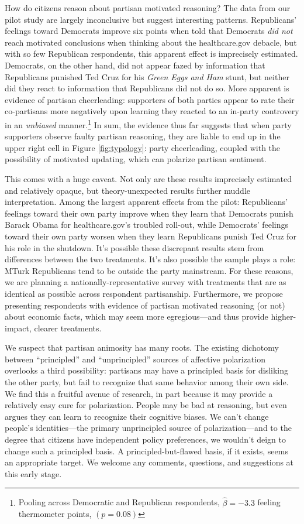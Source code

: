 \documentclass[12pt, letterpaper]{article}
\begin{document}
How do citizens reason about partisan motivated reasoning? The data from our pilot study are largely inconclusive but suggest interesting patterns. Republicans' feelings toward Democrats improve six points when told that Democrats \emph{did not} reach motivated conclusions when thinking about the healthcare.gov debacle, but with so few Republican respondents, this apparent effect is imprecisely estimated. Democrats, on the other hand, did not appear fazed by information that Republicans punished Ted Cruz for his \emph{Green Eggs and Ham} stunt, but neither did they react to information that Republicans did not do so. More apparent is evidence of partisan cheerleading: supporters of both parties appear to rate their co-partisans more negatively upon learning they reacted to an in-party controvery in an \emph{unbiased} manner.\footnote{Pooling across Democratic and Republican respondents, $\hat{\beta}=-3.3$ feeling thermometer points, $(p=0.08)$} In sum, the evidence thus far suggests that when party supporters observe faulty partisan reasoning, they are liable to end up in the upper right cell in Figure \ref{fig:typology}: party cheerleading, coupled with the possibility of motivated updating, which can polarize partisan sentiment.

This comes with a huge caveat. Not only are these results imprecisely estimated and relatively opaque, but theory-unexpected results further muddle interpretation. Among the largest apparent effects from the pilot: Republicans' feelings toward their own party improve when they learn that Democrats punish Barack Obama for healthcare.gov's troubled roll-out, while Democrats' feelings toward their own party worsen when they learn Republicans punish Ted Cruz for his role in the shutdown. It's possible these discrepant results stem from differences between the two treatments. It's also possible the sample plays a role: MTurk Republicans tend to be outside the party mainstream. For these reasons, we are planning a nationally-representative survey with treatments that are as identical as possible across respondent partisanship. Furthermore, we propose presenting respondents with evidence of partisan motivated reasoning (or not) about economic facts, which may seem more egregious---and thus provide higher-impact, clearer treatments.

We suspect that partisan animosity has many roots. The existing dichotomy between ``principled'' and ``unprincipled'' sources of affective polarization overlooks a third possibility: partisans may have a principled basis for disliking the other party, but fail to recognize that same behavior among their own side. We find this a fruitful avenue of research, in part because it may provide a relatively easy cure for polarization. People may be bad at reasoning, but even \citet{Kahneman2011} argues they can learn to recognize their cognitive biases. We can't change people's identities---the primary unprincipled source of polarization---and to the degree that citizens have independent policy preferences, we wouldn't deign to change such a principled basis. A principled-but-flawed basis, if it exists, seems an appropriate target. We welcome any comments, questions, and suggestions at this early stage.
\end{document}
